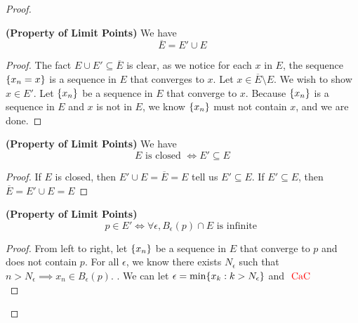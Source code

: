 \documentclass{report}
\begin{document}
\begin{proof}
\begin{definition}
\end{definition}
\begin{theorem}
\label{3.2.7}
\textbf{(Property of Limit Points)} We have
\begin{equation}
\overline{E}=E'\cup E
\end{equation}
\end{theorem}
\begin{proof}
The fact $E\cup E'\subseteq \overline{E}$ is clear, as we notice for each $x$ in $E$, the sequence $\{ x_n=x \}$ is a sequence in $E$ that converges to $x$. Let $x\in \overline{E}\setminus E$. We wish to show $x\in E'$. Let $\{ x_n \}$ be a sequence in $E$ that converge to  $x$. Because $\{ x_n \}$ is a sequence in $E$ and $x$ is not in $E$, we know  $\{ x_n \}$ must not contain $x$, and we are done.
\end{proof}
\begin{corollary}
\label{3.2.8}
\textbf{(Property of Limit Points)} We have
\begin{equation}
E\text{ is closed }\iff  E'\subseteq E
\end{equation}
\end{corollary}
\begin{proof}
If $E$ is closed, then  $E'\cup E=\overline{E}=E$ tell us $E'\subseteq E$. If $E'\subseteq E$, then $\overline{E}=E'\cup E=E$
\end{proof}
\begin{theorem}
\label{3.2.9}
\textbf{(Property of Limit Points)} 
\begin{equation}
p\in E'\iff \forall \epsilon, B_\epsilon (p)\cap E\text{ is infinite }
\end{equation}
\end{theorem}
\begin{proof}
  From left to right, let $\{ x_n \}$ be a sequence in $E$ that converge to $p$ and does not contain  $p$. For all $\epsilon$, we know there exists $N_\epsilon $ such that $n>N_\epsilon \implies x_n\in B_\epsilon (p)$. . We can let $\epsilon=\min \{ x_k:k>N_\epsilon  \}$ and $\text{ \textcolor{red}{CaC} }$\\


\end{proof}
\end{proof}
\end{document}
